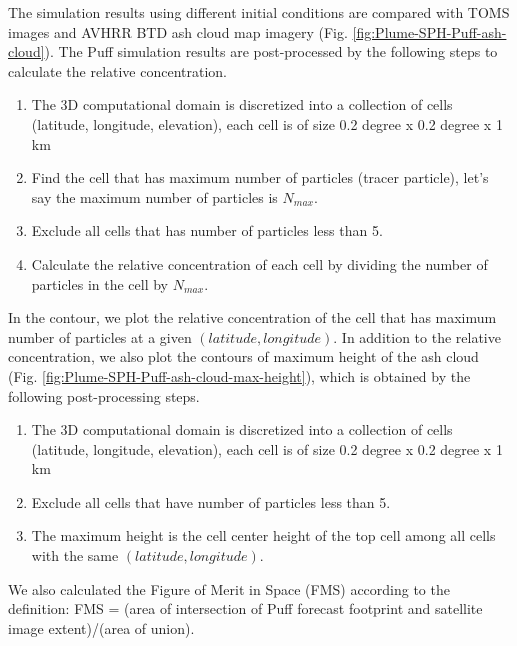\documentclass[utf8]{frontiersSCNS} %
\begin{document}
The simulation results using different initial conditions are compared with TOMS images and AVHRR BTD ash cloud map imagery (Fig. \ref{fig:Plume-SPH-Puff-ash-cloud}). The Puff simulation results are post-processed by the following steps to calculate the relative concentration.
\begin{enumerate}
\item The 3D computational domain is discretized into a collection of cells (latitude, longitude, elevation), each cell is of size 0.2 degree x 0.2 degree x 1 km
\item  Find the cell that has maximum number of particles (tracer particle), let's say the maximum number of particles is $N_{max}$.
\item Exclude all cells that has number of particles less than 5.
\item Calculate the relative concentration of each cell by dividing the number of particles in the cell by $N_{max}$.
\end{enumerate}
In the contour, we plot the relative concentration of the cell that has maximum number of particles at a given $(latitude, longitude)$.
In addition to the relative concentration, we also plot the contours of maximum height of the ash cloud (Fig. \ref{fig:Plume-SPH-Puff-ash-cloud-max-height}), which is obtained by the following post-processing steps.
\begin{enumerate}
\item The 3D computational domain is discretized into a collection of cells (latitude, longitude, elevation), each cell is of size 0.2 degree x 0.2 degree x 1 km
\item Exclude all cells that have number of particles less than 5.
\item The maximum height is the cell center height of the top cell among all cells with the same $(latitude, longitude)$.
\end{enumerate}
We also calculated the Figure of Merit in Space (FMS) according to the definition: FMS = (area of intersection of Puff forecast footprint and satellite image extent)/(area of union).
\end{document}
